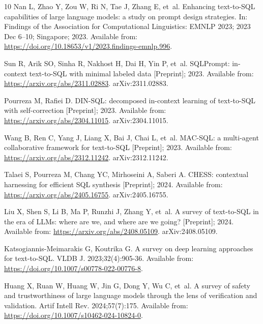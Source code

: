 \begin{thebibliography}{10}
Nan L, Zhao Y, Zou W, Ri N, Tae J, Zhang E, et~al.
\newblock Enhancing text-to-SQL capabilities of large language models: a study
  on prompt design strategies.
\newblock In: Findings of the Association for Computational Linguistics: EMNLP
  2023; 2023 Dec 6--10; Singapore; 2023. Available from:
  \url{https://doi.org/10.18653/v1/2023.findings-emnlp.996}.

Sun R, Arik SO, Sinha R, Nakhost H, Dai H, Yin P, et~al.
\newblock SQLPrompt: in-context text-to-SQL with minimal labeled data
  [Preprint]; 2023.
\newblock Available from: \url{https://arxiv.org/abs/2311.02883}.
\newblock arXiv:2311.02883.

Pourreza M, Rafiei D.
\newblock DIN-SQL: decomposed in-context learning of text-to-SQL with
  self-correction [Preprint]; 2023.
\newblock Available from: \url{https://arxiv.org/abs/2304.11015}.
\newblock arXiv:2304.11015.

Wang B, Ren C, Yang J, Liang X, Bai J, Chai L, et~al.
\newblock MAC-SQL: a multi-agent collaborative framework for text-to-SQL
  [Preprint]; 2023.
\newblock Available from: \url{https://arxiv.org/abs/2312.11242}.
\newblock arXiv:2312.11242.

Talaei S, Pourreza M, Chang YC, Mirhoseini A, Saberi A.
\newblock CHESS: contextual harnessing for efficient SQL synthesis [Preprint];
  2024.
\newblock Available from: \url{https://arxiv.org/abs/2405.16755}.
\newblock arXiv:2405.16755.

Liu X, Shen S, Li B, Ma P, Runzhi J, Zhang Y, et~al.
\newblock A survey of text-to-SQL in the era of LLMs: where are we, and where
  are we going? [Preprint]; 2024.
\newblock Available from: \url{https://arxiv.org/abs/2408.05109}.
\newblock arXiv:2408.05109.

Katsogiannis-Meimarakis G, Koutrika G.
\newblock A survey on deep learning approaches for text-to-SQL.
\newblock VLDB J. 2023;32(4):905-36.
\newblock Available from: \url{https://doi.org/10.1007/s00778-022-00776-8}.

Huang X, Ruan W, Huang W, Jin G, Dong Y, Wu C, et~al.
\newblock A survey of safety and trustworthiness of large language models
  through the lens of verification and validation.
\newblock Artif Intell Rev. 2024;57(7):175.
\newblock Available from: \url{https://doi.org/10.1007/s10462-024-10824-0}.


\end{thebibliography}
